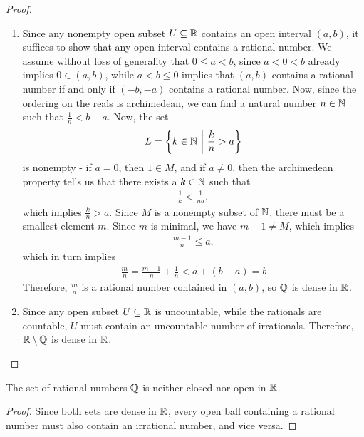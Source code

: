 \begin{proof}
	\begin{enumerate}
		\item Since any nonempty open subset $U \subseteq \mathbb{R}$ contains an open interval $(a,b)$, it suffices to show that any open interval contains a rational number. We assume without loss of generality that $0 \leq a < b$, since $a < 0 < b$ already implies $0 \in (a,b)$, while $a < b \leq 0$ implies that $(a,b)$ contains a rational number if and only if $(-b, -a)$ contains a rational number.
		\newpar
		Now, since the ordering on the reals is archimedean, we can find a natural number $n \in \mathbb{N}$ such that $\frac{1}{n} < b-a$.
		Now, the set
		\begin{align*}
			L = \qty{k \in \mathbb{N}~\middle|~\frac{k}{n} > a}
		\end{align*}
		is nonempty - if $a = 0$, then $1 \in M$, and if $a \neq 0$, then the archimedean property tells us that there exists a $k \in \mathbb{N}$ such that
		\begin{align*}
			\frac{1}{k} < \frac{1}{na},
		\end{align*}
		which implies $\frac{k}{n} > a$. Since $M$ is a nonempty subset of $\mathbb{N}$, there must be a smallest element $m$. Since $m$ is minimal, we have $m-1 \neq M$, which implies 
		\begin{align*}
			\frac{m-1}{n} \leq a,
		\end{align*}
		which in turn implies
		\begin{align*}
			\frac{m}{n} = \frac{m-1}{n} + \frac{1}{n} < a + (b-a) = b
		\end{align*}
		Therefore, $\frac{m}{n}$ is a rational number contained in $(a,b)$, so $\mathbb{Q}$ is dense in $\mathbb{R}$.
		\item Since any open subset $U \subseteq \mathbb{R}$ is uncountable, while the rationals are countable, $U$ must contain an uncountable number of irrationals. Therefore, $\mathbb{R} \setminus \mathbb{Q}$ is dense in $\mathbb{R}$. 
	\end{enumerate}
\end{proof}
\begin{importantcorollary}{}{}
	The set of rational numbers $\mathbb{Q}$ is neither closed nor open in $\mathbb{R}$.
\end{importantcorollary}
\begin{proof}
	Since both sets are dense in $\mathbb{R}$, every open ball containing a rational number must also contain an irrational number, and vice versa.
\end{proof}

\clearpage

